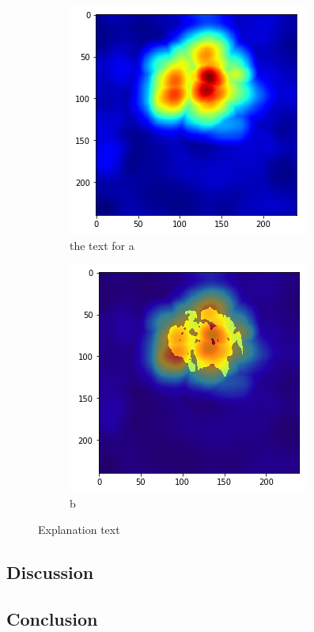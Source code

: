 \begin{figure}[H]
    \centering
    \begin{subfigure}{.5\textwidth}
        \centering
        \includegraphics[width=\linewidth]{chapters/04_segmentation/images/rise_multipixel_max_1-0.png}
        \caption{ the text for a}
    \end{subfigure}%
    \begin{subfigure}{.5\textwidth}
        \centering
        \includegraphics[width=\linewidth]{chapters/04_segmentation/images/rise_multipixel_max_1-1.png}
        \caption{b}
    \end{subfigure}
    \caption{Explanation text}
\end{figure}

\subsection{Discussion}

\subsection{Conclusion}
